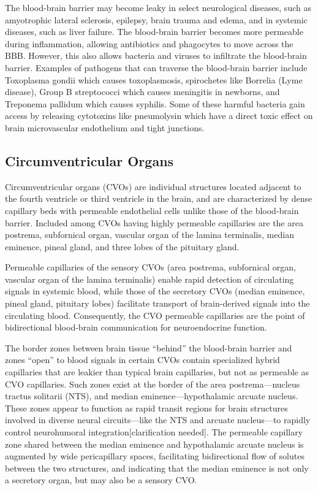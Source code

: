 The blood-brain barrier may become leaky in select neurological diseases, such as amyotrophic lateral sclerosis, epilepsy, brain trauma and edema, and in systemic diseases, such as liver failure. The blood-brain barrier becomes more permeable during inflammation, allowing antibiotics and phagocytes to move across the BBB. However, this also allows bacteria and viruses to infiltrate the blood-brain barrier. Examples of pathogens that can traverse the blood-brain barrier include Toxoplasma gondii which causes toxoplasmosis, spirochetes like Borrelia (Lyme disease), Group B streptococci which causes meningitis in newborns, and Treponema pallidum which causes syphilis. Some of these harmful bacteria gain access by releasing cytotoxins like pneumolysin which have a direct toxic effect on brain microvascular endothelium and tight junctions.

\hypertarget{circumventricular-organs}{%
\subsection{Circumventricular Organs}\label{circumventricular-organs}}

Circumventricular organs (CVOs) are individual structures located adjacent to the fourth ventricle or third ventricle in the brain, and are characterized by dense capillary beds with permeable endothelial cells unlike those of the blood-brain barrier. Included among CVOs having highly permeable capillaries are the area postrema, subfornical organ, vascular organ of the lamina terminalis, median eminence, pineal gland, and three lobes of the pituitary gland.

Permeable capillaries of the sensory CVOs (area postrema, subfornical organ, vascular organ of the lamina terminalis) enable rapid detection of circulating signals in systemic blood, while those of the secretory CVOs (median eminence, pineal gland, pituitary lobes) facilitate transport of brain-derived signals into the circulating blood. Consequently, the CVO permeable capillaries are the point of bidirectional blood-brain communication for neuroendocrine function.

The border zones between brain tissue ``behind'' the blood-brain barrier and zones ``open'' to blood signals in certain CVOs contain specialized hybrid capillaries that are leakier than typical brain capillaries, but not as permeable as CVO capillaries. Such zones exist at the border of the area postrema---nucleus tractus solitarii (NTS), and median eminence---hypothalamic arcuate nucleus. These zones appear to function as rapid transit regions for brain structures involved in diverse neural circuits---like the NTS and arcuate nucleus---to rapidly control neurohumoral integration{[}clarification needed{]}. The permeable capillary zone shared between the median eminence and hypothalamic arcuate nucleus is augmented by wide pericapillary spaces, facilitating bidirectional flow of solutes between the two structures, and indicating that the median eminence is not only a secretory organ, but may also be a sensory CVO.

